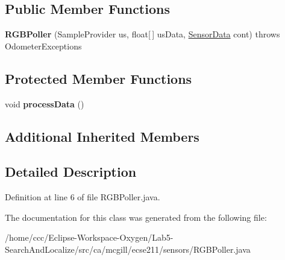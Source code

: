 \subsection*{Public Member Functions}
\begin{DoxyCompactItemize}
\item 
\mbox{\label{classca_1_1mcgill_1_1ecse211_1_1sensors_1_1_r_g_b_poller_aa0e804f9185cb172aa1f63c62d13d168}} 
{\bfseries R\+G\+B\+Poller} (Sample\+Provider us, float\mbox{[}$\,$\mbox{]} us\+Data, \hyperlink{classca_1_1mcgill_1_1ecse211_1_1sensors_1_1_sensor_data}{Sensor\+Data} cont)  throws Odometer\+Exceptions 
\end{DoxyCompactItemize}
\subsection*{Protected Member Functions}
\begin{DoxyCompactItemize}
\item 
\mbox{\label{classca_1_1mcgill_1_1ecse211_1_1sensors_1_1_r_g_b_poller_aa24f4b9ce7425a82fbee017619a49234}} 
void {\bfseries process\+Data} ()
\end{DoxyCompactItemize}
\subsection*{Additional Inherited Members}


\subsection{Detailed Description}


Definition at line 6 of file R\+G\+B\+Poller.\+java.



The documentation for this class was generated from the following file\+:\begin{DoxyCompactItemize}
\item 
/home/ccc/\+Eclipse-\/\+Workspace-\/\+Oxygen/\+Lab5-\/\+Search\+And\+Localize/src/ca/mcgill/ecse211/sensors/R\+G\+B\+Poller.\+java\end{DoxyCompactItemize}
